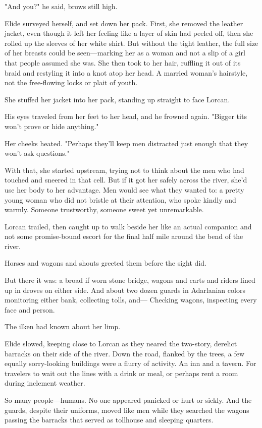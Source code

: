 "And you?"
he said, brows still high.

Elide surveyed herself, and set down her pack.
First, she removed the leather jacket, even though it left her feeling like a layer of skin had peeled off, then she rolled up the sleeves of her white shirt.
But without the tight leather, the full size of her breasts could be seen---marking her as a woman and not a slip of a girl that people assumed she was.
She then took to her hair, ruffling it out of its braid and restyling it into a knot atop her head.
A married woman's hairstyle, not the free-flowing locks or plait of youth.

She stuffed her jacket into her pack, standing up straight to face Lorcan.

His eyes traveled from her feet to her head, and he frowned again.
"Bigger tits won't prove or hide anything."

Her cheeks heated.
"Perhaps they'll keep men distracted just enough that they won't ask questions."

With that, she started upstream, trying not to think about the men who had touched and sneered in that cell.
But if it got her safely across the river, she'd use her body to her advantage.
Men would see what they wanted to: a pretty young woman who did not bristle at their attention, who spoke kindly and warmly.
Someone trustworthy, someone sweet yet unremarkable.

Lorcan trailed, then caught up to walk beside her like an actual companion and not some promise-bound escort for the final half mile around the bend of the river.

Horses and wagons and shouts greeted them before the sight did.

But there it was: a broad if worn stone bridge, wagons and carts and riders lined up in droves on either side.
And about two dozen guards in Adarlanian colors monitoring either bank, collecting tolls, and--- Checking wagons, inspecting every face and person.

The ilken had known about her limp.

Elide slowed, keeping close to Lorcan as they neared the two-story, derelict barracks on their side of the river.
Down the road, flanked by the trees, a few equally sorry-looking buildings were a flurry of activity.
An inn and a tavern.
For travelers to wait out the lines with a drink or meal, or perhaps rent a room during inclement weather.

So many people---humans.
No one appeared panicked or hurt or sickly.
And the guards, despite their uniforms, moved like men while they searched the wagons passing the barracks that served as tollhouse and sleeping quarters.

